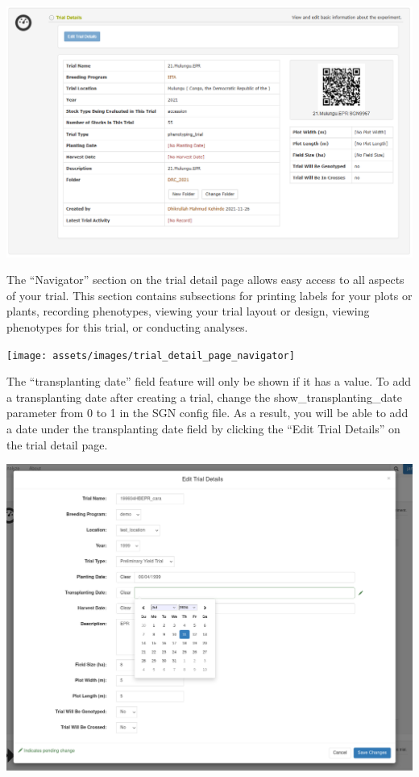 \documentclass[
  12pt,
]{book}
\begin{document}
\begin{center}\includegraphics[width=0.95\linewidth]{assets/images/trial_detail_page_start} \end{center}

The ``Navigator'' section on the trial detail page allows easy access to all aspects of your trial. This section contains subsections for printing labels for your plots or plants, recording phenotypes, viewing your trial layout or design, viewing phenotypes for this trial, or conducting analyses.

\begin{center}\texttt{[image: assets/images/trial\_detail\_page\_navigator]} \end{center}

The ``transplanting date'' field feature will only be shown if it has a value. To add a transplanting date after creating a trial, change the show\_transplanting\_date parameter from 0 to 1 in the SGN config file. As a result, you will be able to add a date under the transplanting date field by clicking the ``Edit Trial Details'' on the trial detail page.

\begin{center}\includegraphics[width=0.95\linewidth]{assets/images/add_transplanting_date} \end{center}
\end{document}
